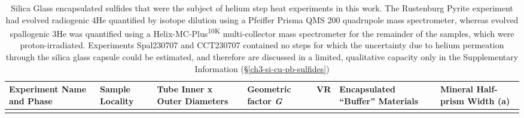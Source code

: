 \begin{longtable}[]{@{}
  >{\raggedright\arraybackslash}p{}
  >{\raggedright\arraybackslash}p{}
  >{\raggedright\arraybackslash}p{}
  >{\raggedright\arraybackslash}p{}
  >{\raggedright\arraybackslash}p{}
  >{\raggedright\arraybackslash}p{}
  >{\raggedright\arraybackslash}p{}@{}}
\caption{Silica Glass encapsulated sulfides that were the
subject of helium step heat experiments in this work. The Rustenburg
Pyrite experiment had evolved radiogenic 4He quantified by isotope
dilution using a Pfeiffer Prisma QMS 200 quadrupole mass spectrometer,
whereas evolved spallogenic 3He was quantified using a
Helix-MC-Plus\textsuperscript{10K} multi-collector mass spectrometer for
the remainder of the samples, which were proton-irradiated. Experiments
Spal230707 and CCT230707 contained no steps for which the uncertainty
due to helium permeation through the silica glass capsule could be
estimated, and therefore are discussed in a limited, qualitative
capacity only in the Supplementary Information (\S\ref{ch3-si-cu-pb-sulfides})}\tabularnewline
\toprule\noalign{}
\begin{minipage}[b]{\linewidth}\raggedright
Experiment Name and Phase
\end{minipage} & \begin{minipage}[b]{\linewidth}\raggedright
Sample Locality
\end{minipage} & \begin{minipage}[b]{\linewidth}\raggedright
Tube Inner x Outer Diameters
\end{minipage} & \begin{minipage}[b]{\linewidth}\raggedright
Geometric factor \emph{G}
\end{minipage} & \begin{minipage}[b]{\linewidth}\raggedright
VR
\end{minipage} & \begin{minipage}[b]{\linewidth}\raggedright
Encapsulated ``Buffer'' Materials
\end{minipage} & \begin{minipage}[b]{\linewidth}\raggedright
Mineral Half-prism Width (a)
\end{minipage} \\
\midrule\noalign{}

\end{longtable}
